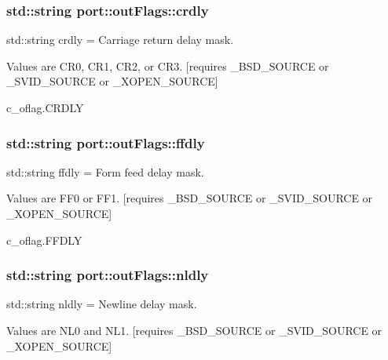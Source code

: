 \subsubsection[{\texorpdfstring{crdly}{crdly}}]{\setlength{\rightskip}{0pt plus 5cm}std\+::string port\+::out\+Flags\+::crdly}\hypertarget{classport_1_1outFlags_ac7a49c39de79d430c46ae93259e9ff39}{}\label{classport_1_1outFlags_ac7a49c39de79d430c46ae93259e9ff39}


std\+::string crdly = Carriage return delay mask. 

Values are C\+R0, C\+R1, C\+R2, or C\+R3. \mbox{[}requires \+\_\+\+B\+S\+D\+\_\+\+S\+O\+U\+R\+CE or \+\_\+\+S\+V\+I\+D\+\_\+\+S\+O\+U\+R\+CE or \+\_\+\+X\+O\+P\+E\+N\+\_\+\+S\+O\+U\+R\+CE\mbox{]} 

c\+\_\+oflag.\+C\+R\+D\+LY
\subsubsection[{\texorpdfstring{ffdly}{ffdly}}]{\setlength{\rightskip}{0pt plus 5cm}std\+::string port\+::out\+Flags\+::ffdly}\hypertarget{classport_1_1outFlags_a725b1f54764d756dab67994a00214c67}{}\label{classport_1_1outFlags_a725b1f54764d756dab67994a00214c67}


std\+::string ffdly = Form feed delay mask. 

Values are F\+F0 or F\+F1. \mbox{[}requires \+\_\+\+B\+S\+D\+\_\+\+S\+O\+U\+R\+CE or \+\_\+\+S\+V\+I\+D\+\_\+\+S\+O\+U\+R\+CE or \+\_\+\+X\+O\+P\+E\+N\+\_\+\+S\+O\+U\+R\+CE\mbox{]} 

c\+\_\+oflag.\+F\+F\+D\+LY
\subsubsection[{\texorpdfstring{nldly}{nldly}}]{\setlength{\rightskip}{0pt plus 5cm}std\+::string port\+::out\+Flags\+::nldly}\hypertarget{classport_1_1outFlags_a719b452f6a266623254a5e0ad68f38af}{}\label{classport_1_1outFlags_a719b452f6a266623254a5e0ad68f38af}


std\+::string nldly = Newline delay mask. 

Values are N\+L0 and N\+L1. \mbox{[}requires \+\_\+\+B\+S\+D\+\_\+\+S\+O\+U\+R\+CE or \+\_\+\+S\+V\+I\+D\+\_\+\+S\+O\+U\+R\+CE or \+\_\+\+X\+O\+P\+E\+N\+\_\+\+S\+O\+U\+R\+CE\mbox{]} 

